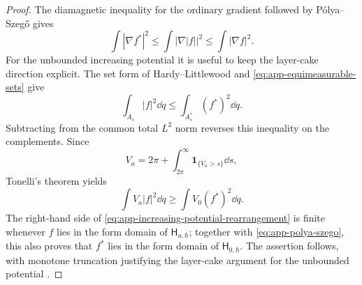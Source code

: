 \begin{proof}
The diamagnetic inequality for the ordinary gradient followed by
P\'olya--Szeg\H{o} gives
\begin{equation}
 \int|\nabla f^*|^2
 \le\int|\nabla|f||^2
 \le\int|\nabla f|^2.
 \label{eq:app-polya-szego}
\end{equation}
For the unbounded increasing potential it is useful to keep the layer-cake
direction explicit.  The set form of Hardy--Littlewood and
\cref{eq:app-equimeasurable-sets} give
\begin{equation}
 \int_{A_s}|f|^2\dd q
 \le\int_{A_s^*}(f^*)^2\dd q.
\end{equation}
Subtracting from the common total \(L^2\) norm reverses this inequality on
the complements.  Since
\begin{equation}
 V_a=2\pi+\int_{2\pi}^{\infty}
 \mathbf1_{\{V_a>s\}}\dd s,
\end{equation}
Tonelli's theorem yields
\begin{equation}
 \int V_a|f|^2\dd q
 \ge\int V_0(f^*)^2\dd q.
 \label{eq:app-increasing-potential-rearrangement}
\end{equation}
The right-hand side of
\cref{eq:app-increasing-potential-rearrangement} is finite whenever \(f\)
lies in the form domain of \(\mathsf H_{a,\hbar}\); together with
\cref{eq:app-polya-szego}, this also proves that \(f^*\) lies in the form
domain of \(\mathsf H_{0,\hbar}\).  The assertion follows, with monotone
truncation justifying the layer-cake argument for the unbounded potential
\citep{LiebLoss2001}.
\end{proof}

